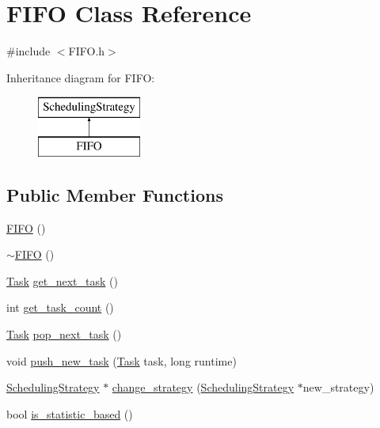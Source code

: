 \hypertarget{class_f_i_f_o}{}\section{F\+I\+F\+O Class Reference}
\label{class_f_i_f_o}


{\ttfamily \#include $<$F\+I\+F\+O.\+h$>$}

Inheritance diagram for F\+I\+F\+O\+:\begin{figure}[H]
\begin{center}
\leavevmode
\includegraphics[height=2.000000cm]{class_f_i_f_o}
\end{center}
\end{figure}
\subsection*{Public Member Functions}
\begin{DoxyCompactItemize}
\item 
\hyperlink{class_f_i_f_o_aea969385961885a8e70732482d64fead}{F\+I\+F\+O} ()
\item 
\hyperlink{class_f_i_f_o_a44d31a29b91fed5e154f26bf9df4d280}{$\sim$\+F\+I\+F\+O} ()
\item 
\hyperlink{_types_8h_a0c77930ab3818a1680c59353f627fba8}{Task} \hyperlink{class_f_i_f_o_a4f1234aa7afcd3017a7e0470a63a28c7}{get\+\_\+next\+\_\+task} ()
\item 
int \hyperlink{class_f_i_f_o_a4a03d69c49827b555a4968733195fd01}{get\+\_\+task\+\_\+count} ()
\item 
\hyperlink{_types_8h_a0c77930ab3818a1680c59353f627fba8}{Task} \hyperlink{class_f_i_f_o_aa96d491319ffa72dbb923693a692ed40}{pop\+\_\+next\+\_\+task} ()
\item 
void \hyperlink{class_f_i_f_o_aa91a84fbe7f8755b4fd7dab27dfd3b72}{push\+\_\+new\+\_\+task} (\hyperlink{_types_8h_a0c77930ab3818a1680c59353f627fba8}{Task} task, long runtime)
\item 
\hyperlink{class_scheduling_strategy}{Scheduling\+Strategy} $\ast$ \hyperlink{class_f_i_f_o_a1f94031b462c35718f2d3ebe16acfa9c}{change\+\_\+strategy} (\hyperlink{class_scheduling_strategy}{Scheduling\+Strategy} $\ast$new\+\_\+strategy)
\item 
bool \hyperlink{class_f_i_f_o_aff0f1a994e551ccfad05e7338652a16d}{is\+\_\+statistic\+\_\+based} ()
\end{DoxyCompactItemize}
